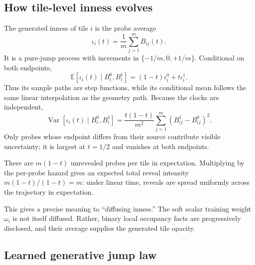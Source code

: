 \documentclass[11pt]{article}
\newcommand{\E}{\mathbb{E}}
\newcommand{\1}{\mathbf{1}}
\begin{document}
\subsection{How tile-level inness evolves}

The generated inness of tile \(i\) is the probe average
\[
  \iota_i(t)=\frac1m\sum_{j=1}^m B_{ij}(t).
\]
It is a pure-jump process with increments in
\(\{-1/m,0,+1/m\}\).  Conditional on both endpoints,
\[
  \E[\iota_i(t)\mid B_i^0,B_i^1]
  =(1-t)\iota_i^0+t\iota_i^1.
\]
Thus its sample paths are step functions, while its conditional mean follows
the same linear interpolation as the geometry path.  Because the clocks are
independent,
\[
  \operatorname{Var}[\iota_i(t)\mid B_i^0,B_i^1]
  =\frac{t(1-t)}{m^2}
   \sum_{j=1}^m(B^1_{ij}-B^0_{ij})^2.
\]
Only probes whose endpoint differs from their source contribute visible
uncertainty; it is largest at \(t=1/2\) and vanishes at both endpoints.

There are \(m(1-t)\) unrevealed probes per tile in expectation.  Multiplying
by the per-probe hazard gives an expected total reveal intensity
\(m(1-t)/(1-t)=m\): under linear time, reveals are spread uniformly across
the trajectory in expectation.

This gives a precise meaning to ``diffusing inness.''  The soft scalar
training weight \(\omega_i\) is not itself diffused.  Rather, binary local
occupancy facts are progressively disclosed, and their average supplies the
generated tile opacity.

\begin{center}
\end{center}

\subsection{Learned generative jump law}
\end{document}
